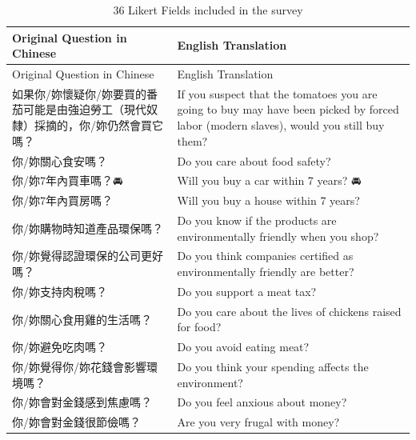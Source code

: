 \documentclass[
  letterpaper,
  DIV=11,
  numbers=noendperiod]{scrartcl}
\begin{document}
\begin{longtable}[]{@{}
  >{\raggedright\arraybackslash}p{}
  >{\raggedright\arraybackslash}p{}@{}}
\caption{36 Likert Fields included in the survey}\tabularnewline
\toprule\noalign{}
\begin{minipage}[b]{\linewidth}\raggedright
Original Question in Chinese
\end{minipage} & \begin{minipage}[b]{\linewidth}\raggedright
English Translation
\end{minipage} \\
\midrule\noalign{}
\endfirsthead
\toprule\noalign{}
\begin{minipage}[b]{\linewidth}\raggedright
Original Question in Chinese
\end{minipage} & \begin{minipage}[b]{\linewidth}\raggedright
English Translation
\end{minipage} \\
\midrule\noalign{}
\endhead
\bottomrule\noalign{}
\endlastfoot
如果你/妳懷疑你/妳要買的番茄可能是由強迫勞工（現代奴隸）採摘的，你/妳仍然會買它嗎？
& If you suspect that the tomatoes you are going to buy may have been
picked by forced labor (modern slaves), would you still buy them? \\
你/妳關心食安嗎？ & Do you care about food safety? \\
你/妳7年內買車嗎？🚘 & Will you buy a car within 7 years? 🚘 \\
你/妳7年內買房嗎？🏡 & Will you buy a house within 7 years? 🏡 \\
你/妳購物時知道產品環保嗎？ & Do you know if the products are
environmentally friendly when you shop? \\
你/妳覺得認證環保的公司更好嗎？ & Do you think companies certified as
environmentally friendly are better? \\
你/妳支持肉稅嗎？ & Do you support a meat tax? \\
你/妳關心食用雞的生活嗎？ & Do you care about the lives of chickens
raised for food? \\
你/妳避免吃肉嗎？ & Do you avoid eating meat? \\
你/妳覺得你/妳花錢會影響環境嗎？ & Do you think your spending affects
the environment? \\
你/妳會對金錢感到焦慮嗎？ & Do you feel anxious about money? \\
你/妳會對金錢很節儉嗎？ & Are you very frugal with money? \\

\end{longtable}
\end{document}
